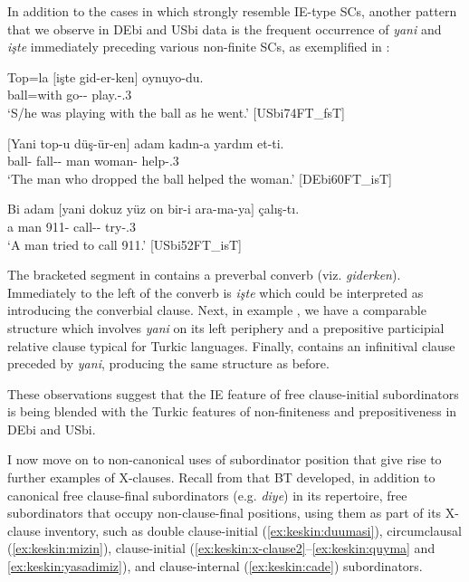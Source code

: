 \documentclass[output=paper,colorlinks,citecolor=brown]{langscibook}
\begin{document}
In addition to the cases in  which strongly resemble IE-type SCs, another pattern that we observe in DEbi and USbi data is the frequent occurrence of \textit{yani} and \textit{işte} immediately preceding various non-finite SCs, as exemplified in :

\ea \label{ex:keskin:conn_nfin_iste}
\gll Top=la	$[$işte	gid-er-ken$]$	oynuyo-du.\\
	ball=with	\hphantom{[}\Conn{}	go-\Aor-\Conv{} play.\Prog-\Pst.3\Sg\\
\glt ‘S/he was playing with the ball as he went.’ [USbi74FT\_fsT]

\ex \label{ex:keskin:conn_nfin_yani1}
\gll $[$Yani	top-u	düş-ür-en$]$	adam	kadın-a	{yardım et}-ti.\\
	\hphantom{[}\Conn{}	ball-\Acc{}	fall-\Caus-\Srel{}	man	woman-\Dat{}	help-\Pst.3\Sg\\
\glt ‘The man who dropped the ball helped the woman.’ [DEbi60FT\_isT]

\ex \label{ex:keskin:conn_nfin_yani2}
\gll Bi	adam	$[$yani	{dokuz yüz on bir}-i	ara-ma-ya$]$	çalış-tı.\\
	a	man \hphantom{[}\Conn{}	911-\Acc{} call-\Nsub-\Dat{} try-\Pst.3\Sg\\
\glt ‘A man tried to call 911.’ [USbi52FT\_isT]
\z

\noindent
The bracketed segment in  contains a preverbal converb (viz. \textit{giderken}). Immediately to the left of the converb is \textit{işte} which could be interpreted as introducing the converbial clause. Next, in example , we have a comparable structure which involves \textit{yani} on its left periphery and a prepositive participial relative clause typical for Turkic languages. Finally,  contains an infinitival clause preceded by \textit{yani}, producing the same structure as before.

These observations suggest that the IE feature of free clause-initial subordinators is being blended with the Turkic features of non-finiteness and prepositiveness in DEbi and USbi.


I now move on to non-canonical uses of subordinator position that give rise to further examples of X-clauses. Recall from  that BT developed, in addition to canonical free clause-final subordinators (e.g. \textit{diye}) in its repertoire, free subordinators that occupy non-clause-final positions, using them as part of its X-clause inventory, such as double clause-initial (\ref{ex:keskin:duumasi}), circumclausal (\ref{ex:keskin:mizin}), clause-initial (\ref{ex:keskin:x-clause2}--\ref{ex:keskin:quyma} and \ref{ex:keskin:yasadimiz}), and clause-internal (\ref{ex:keskin:cade}) subordinators.
\end{document}
